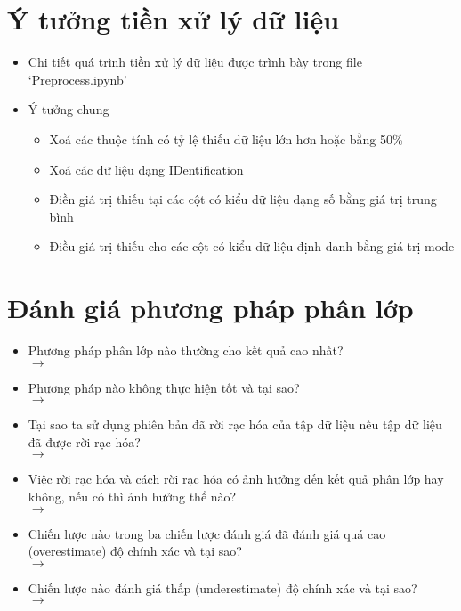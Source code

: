 \documentclass[a4paper, 12pt]{article}
\begin{document}
\section{Ý tưởng tiền xử lý dữ liệu}

\begin{itemize}
    \item Chi tiết quá trình tiền xử lý dữ liệu được trình bày trong file `Preprocess.ipynb'
    \item Ý tưởng chung
    \begin{itemize}
        \item Xoá các thuộc tính có tỷ lệ thiếu dữ liệu lớn hơn hoặc bằng 50\%
        \item Xoá các dữ liệu dạng IDentification
        \item Điền giá trị thiếu tại các cột có kiểu dữ liệu dạng số bằng giá trị trung bình 
        \item Điều giá trị thiếu cho các cột có kiểu dữ liệu định danh bằng giá trị mode
    \end{itemize}
\end{itemize}
\clearpage

\section{Đánh giá phương pháp phân lớp}

\begin{itemize}
    \item Phương pháp phân lớp nào thường cho kết quả cao nhất?\\
    $\rightarrow$

    \item Phương pháp nào không thực hiện tốt và tại sao?\\
    $\rightarrow$

    \item Tại sao ta sử dụng phiên bản đã rời rạc hóa của tập dữ liệu nếu tập dữ liệu đã được rời rạc hóa?\\
    $\rightarrow$
    \item Việc rời rạc hóa và cách rời rạc hóa có ảnh hưởng đến kết quả phân lớp hay không, nếu có thì ảnh hưởng thể nào?\\
    $\rightarrow$

    \item Chiến lược nào trong ba chiến lược đánh giá đã đánh giá quá cao (overestimate) độ chính xác và tại sao?\\
    $\rightarrow$

    \item Chiến lược nào đánh giá thấp (underestimate) độ chính xác và tại sao?\\
    $\rightarrow$
\end{itemize}
\clearpage
\end{document}
